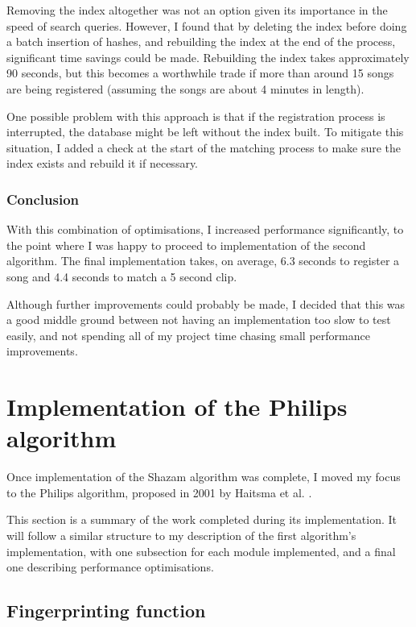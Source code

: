\documentclass[12pt,a4paper,twoside,openright]{report}
\begin{document}
Removing the index altogether was not an option given its importance in the speed of search queries. However, I found that by deleting the index before doing a batch insertion of hashes, and rebuilding the index at the end of the process, significant time savings could be made. Rebuilding the index takes approximately 90 seconds, but this becomes a worthwhile trade if more than around 15 songs are being registered (assuming the songs are about 4 minutes in length).

One possible problem with this approach is that if the registration process is interrupted, the database might be left without the index built. To mitigate this situation, I added a check at the start of the matching process to make sure the index exists and rebuild it if necessary.

\subsubsection{Conclusion}

With this combination of optimisations, I increased performance significantly, to the point where I was happy to proceed to implementation of the second algorithm. The final implementation takes, on average, 6.3 seconds to register a song and 4.4 seconds to match a 5 second clip.

Although further improvements could probably be made, I decided that this was a good middle ground between not having an implementation too slow to test easily, and not spending all of my project time chasing small performance improvements.



\section{Implementation of the Philips algorithm}
\label{section:philips}

Once implementation of the Shazam algorithm was complete, I moved my focus to the Philips algorithm, proposed in 2001 by Haitsma et al. \cite{Haitsma02}. 

This section is a summary of the work completed during its implementation. It will follow a similar structure to my description of the first algorithm's implementation, with one subsection for each module implemented, and a final one describing performance optimisations.


\subsection{Fingerprinting function}
\label{philips:fingerprinter}
\end{document}
